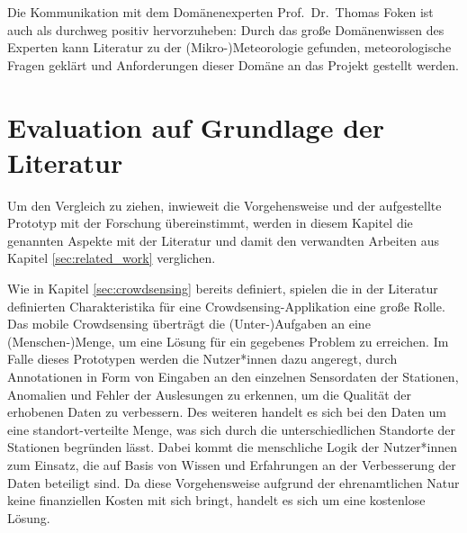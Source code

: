 Die Kommunikation mit dem Domänenexperten Prof.\ Dr.\ Thomas Foken ist auch als durchweg positiv hervorzuheben: Durch das große Domänenwissen des Experten kann Literatur zu der (Mikro-)Meteorologie gefunden, meteorologische Fragen geklärt und Anforderungen dieser Domäne an das Projekt gestellt werden.

\section{Evaluation auf Grundlage der Literatur}
\label{sec:evaluationliteratur}
Um den Vergleich zu ziehen, inwieweit die Vorgehensweise und der aufgestellte Prototyp mit der Forschung übereinstimmt, werden in diesem Kapitel die genannten Aspekte mit der Literatur und damit den verwandten Arbeiten aus Kapitel \ref{sec:related_work} verglichen.

Wie in Kapitel \ref{sec:crowdsensing} bereits definiert, spielen die in der Literatur definierten Charakteristika für eine Crowdsensing-Applikation eine große Rolle. Das mobile Crowdsensing überträgt die (Unter-)Aufgaben an eine (Menschen-)Menge, um eine Lösung für ein gegebenes Problem zu erreichen. Im Falle dieses Prototypen werden die Nutzer*innen dazu angeregt, durch Annotationen in Form von Eingaben an den einzelnen Sensordaten der Stationen, Anomalien und Fehler der Auslesungen zu erkennen, um die Qualität der erhobenen Daten zu verbessern. Des weiteren handelt es sich bei den Daten um eine standort-verteilte Menge, was sich durch die unterschiedlichen Standorte der Stationen begründen lässt. Dabei kommt die menschliche Logik der Nutzer*innen zum Einsatz, die auf Basis von Wissen und Erfahrungen an der Verbesserung der Daten beteiligt sind. Da diese Vorgehensweise aufgrund der ehrenamtlichen Natur keine finanziellen Kosten mit sich bringt, handelt es sich um eine kostenlose Lösung.

